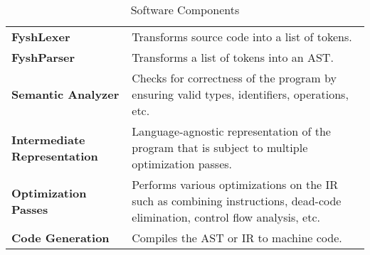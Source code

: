 \newcommand{\sw}[2]{%
	\textbf{#1} & #2 \\%
	\hline%
}
\begin{table}[H]
	\begin{tabularx}{\textwidth}{| a | x |}
		\hline
		 &  \\
		\hline
		\sw{FyshLexer}{Transforms source code into a list of tokens.}
		\sw{FyshParser}{Transforms a list of tokens into an AST.}
		\sw{Semantic Analyzer}{%
			Checks for correctness of the program by ensuring valid types,
			identifiers, operations, etc.}
		\sw{Intermediate Representation}{%
			Language-agnostic representation of the program that is subject to
			multiple optimization passes.}
		\sw{Optimization Passes}{%
			Performs various optimizations on the IR such as combining instructions,
			dead-code elimination, control flow analysis, etc.}
		\sw{Code Generation}{Compiles the AST or IR to machine code.}
	\end{tabularx}
	\caption{Software Components}
\end{table}

